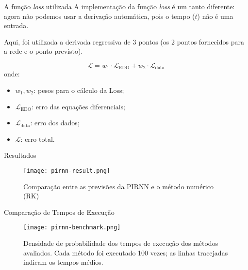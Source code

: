 \begin{frame}{A função \textit{loss} utilizada}
  A implementação da função \textit{loss} é um tanto diferente: agora não podemos usar a derivação automática, pois o tempo ($t$) não é uma entrada.

  Aqui, foi utilizada a derivada regressiva de 3 pontos (os 2 pontos fornecidos para a rede e o ponto previsto).

  \begin{equation}
    \mathcal{L} = w_1 \cdot \mathcal{L}_{\text{EDO}} + w_2 \cdot \mathcal{L}_{\text{data}}
  \end{equation}
  onde:
  \begin{itemize}
    \item $w_1, w_2$: pesos para o cálculo da Loss;
    \item $\mathcal{L}_{\text{EDO}}$: erro das equações diferenciais;
    \item $\mathcal{L}_{\text{data}}$: erro dos dados;
    \item $\mathcal{L}$: erro total.
  \end{itemize}
\end{frame}

\begin{frame}{Resultados}
  \begin{figure}
    \centering
    \texttt{[image: pirnn-result.png]}
    \caption{Comparação entre as previsões da PIRNN e o método numérico (RK)}
  \end{figure}
\end{frame}

\begin{frame}{Comparação de Tempos de Execução}
  \begin{figure}
    \centering
    \texttt{[image: pirnn-benchmark.png]}
    \caption{Densidade de probabilidade dos tempos de execução dos métodos avaliados. Cada método foi executado 100 vezes; as linhas tracejadas indicam os tempos médios.}
  \end{figure}
\end{frame}

